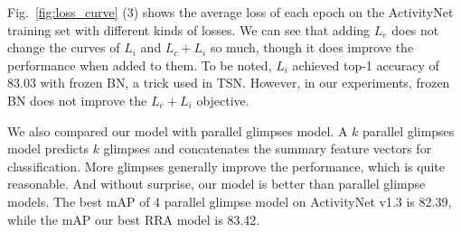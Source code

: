 \documentclass[runningheads]{llncs}
\begin{document}
Fig.~\ref{fig:loss_curve} (3) shows the average loss of each epoch on the ActivityNet training set with different kinds of losses. We can see that adding $L_e$ does not change the curves of $L_i$ and $L_c+L_i$ so much, though it does improve the performance when added to them. To be noted, $L_i$ achieved top-1 accuracy of 83.03 with frozen BN, a trick used in TSN. However, in our experiments, frozen BN does not improve the $L_e+L_i$ objective.

We also compared our model with parallel glimpses model. A $k$ parallel glimpses model predicts $k$ glimpses and concatenates the summary feature vectors for classification. More glimpses generally improve the performance, which is quite reasonable. And without surprise, our model is better than parallel glimpse models. The best mAP of 4 parallel glimpse model on ActivityNet v1.3 is 82.39, while the mAP our best RRA model is 83.42.



\begin{table}[htbp]
  \centering
{}
\caption{Ablation mAPs on the ActivityNet v1.3 validation set, with ResNet-152. \emph{Left}: changing number of glimpses from 1 to 5. \emph{Right}: modifying RRA module into: 1.spatio-temporal average pooling instead of attention; 2.spatial attention and temporal average pooling; 3.no BN; 4.no ReLU; 5.no tanh; 6.-ReLU(x) instead of tanh(x). All the settings are the same as the 83.42 mAP model except for the specified variations.}
  \label{tab:ablation}
\end{table}
\end{document}
